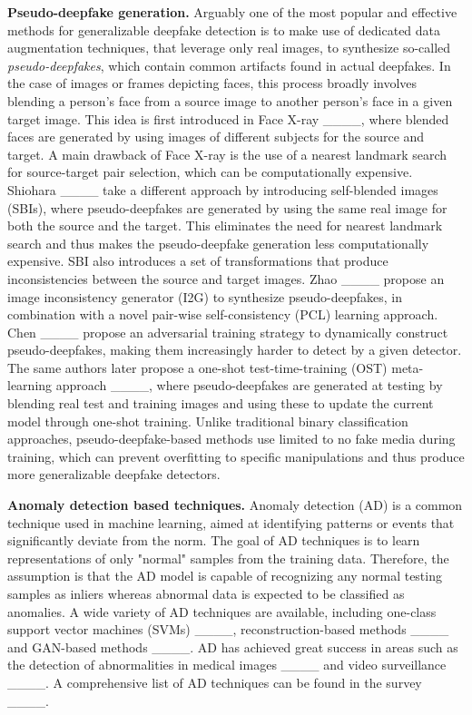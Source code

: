\noindent\textbf{Pseudo-deepfake generation.} Arguably one of the most popular and effective methods for generalizable deepfake detection is to make use of dedicated data augmentation techniques, that leverage only real images, to synthesize so-called \textit{pseudo-deepfakes}, which contain common artifacts found in actual deepfakes. In the case of images or frames depicting faces, this process broadly involves blending a person's face from a source image to another person's face in a given target image. This idea is first introduced in Face X-ray ____, where blended faces are generated by using images of different subjects for the source and target. A main drawback of Face X-ray is the use of a nearest landmark search for source-target pair selection, which can be computationally expensive. Shiohara \etal ____ take a different approach by introducing self-blended images (SBIs), where pseudo-deepfakes are generated by using the same real image for both the source and the target. This eliminates the need for nearest landmark search and thus makes the pseudo-deepfake generation less computationally expensive. SBI also introduces a set of transformations that produce inconsistencies between the source and target images. Zhao \etal ____ propose an image inconsistency generator (I2G) to synthesize pseudo-deepfakes, in combination with a novel pair-wise self-consistency (PCL) learning approach. Chen \etal ____ propose an adversarial training strategy to dynamically construct pseudo-deepfakes, making them increasingly harder to detect by a given detector. The same authors later propose a one-shot test-time-training (OST) meta-learning approach ____, where pseudo-deepfakes are generated at testing by blending real test and training images and using these to update the current model through one-shot training. Unlike traditional binary classification approaches, pseudo-deepfake-based methods use limited to no fake media during training, which can prevent overfitting to specific manipulations and thus produce more generalizable deepfake detectors.

\noindent\textbf{Anomaly detection based techniques.} Anomaly detection (AD) is a common technique used in machine learning, aimed at identifying patterns or events that significantly deviate from the norm. The goal of AD techniques is to learn representations of only "normal" samples from the training data. Therefore, the assumption is that the AD model is capable of recognizing any normal testing samples as inliers whereas abnormal data is expected to be classified as anomalies. A wide variety of AD techniques are available, including one-class support vector machines (SVMs) ____, reconstruction-based methods ____ and GAN-based methods ____. AD has achieved great success in areas such as the detection of abnormalities in medical images ____ and video surveillance ____. A comprehensive list of AD techniques can be found in the survey ____. 

